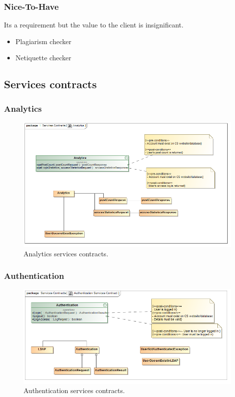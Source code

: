 \documentclass [a4paper,12pt] {article}
\begin{document}
	\subsubsection{Nice-To-Have}Its a requirement but the value to the client is insignificant.
		\begin{itemize}
			\item Plagiarism checker
			\item Netiquette checker
		\end{itemize}

\pagebreak
	\subsection{Services contracts}
		\subsubsection{Analytics}
			\begin{figure}[H]
				\centering
				\includegraphics[width=1.0\textwidth]{AnalyticsSC.png}
				\caption{Analytics services contracts.}
			\end{figure}
		\subsubsection{Authentication}
			\begin{figure}[H]
						\centering
						\includegraphics[width=1.0\textwidth]{AuthenticationSC.png}
						\caption{Authentication services contracts.}
			\end{figure}
\end{document}
